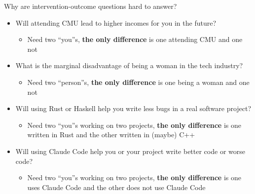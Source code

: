 \documentclass[aspectratio=169, 12pt]{beamer}
\newcommand{\redt}[1]{\textcolor{emphred}{#1}}
\begin{document}
\begin{frame}{Why are intervention-outcome questions hard to answer?}
\begin{itemize}\setlength\itemsep{0.3em}
  \item Will attending CMU lead to higher incomes \redt{for you} in the future?
    \begin{itemize}
      \item Need two ``you''s, \textbf{the only difference} is one attending CMU and one not
    \end{itemize}
    \vspace{1em}
  \item What is the \redt{marginal disadvantage of being a woman} in the tech industry?
    \begin{itemize}
      \item Need two ``person''s, \textbf{the only difference} is one being a woman and one not
    \end{itemize}
    \vspace{1em}
  \item Will using Rust or Haskell \redt{help you write less bugs} in a real software project?
    \begin{itemize}
      \item Need two ``you''s working on two projects, \textbf{the only difference} is one written in Rust and the other written in (maybe) C++
    \end{itemize}
    \vspace{1em}
  \item Will using Claude Code \redt{help you or your project} write better code or worse code?
    \begin{itemize}
      \item Need two ``you''s working on two projects, \textbf{the only difference} is one uses Claude Code and the other does not use Claude Code
    \end{itemize}
    \vspace{1em}
\end{itemize}
\end{frame}
\end{document}
